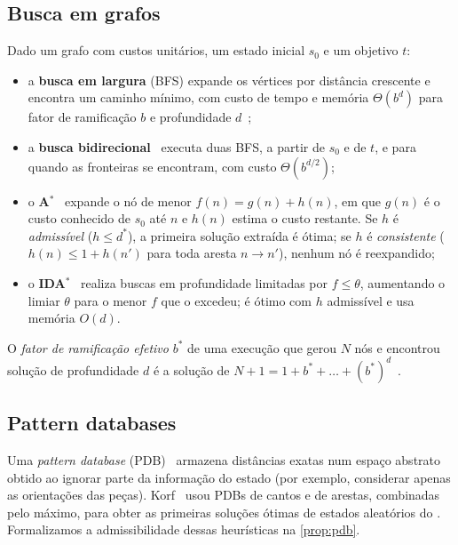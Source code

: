 \subsection{Busca em grafos}
Dado um grafo com custos unitários, um estado inicial $s_0$ e um objetivo $t$:
\begin{itemize}[nosep]
\item a \textbf{busca em largura} (BFS) expande os vértices por distância crescente e encontra um caminho mínimo, com custo de tempo e memória $\Theta(b^d)$ para fator de ramificação $b$ e profundidade $d$~\cite{russell2021};
\item a \textbf{busca bidirecional}~\cite{pohl1971} executa duas BFS, a partir de $s_0$ e de $t$, e para quando as fronteiras se encontram, com custo $\Theta(b^{d/2})$;
\item o \textbf{A$^*$}~\cite{hart1968} expande o nó de menor $f(n)=g(n)+h(n)$, em que $g(n)$ é o custo conhecido de $s_0$ até $n$ e $h(n)$ estima o custo restante. Se $h$ é \emph{admissível} ($h\le d^*$), a primeira solução extraída é ótima; se $h$ é \emph{consistente} ($h(n)\le 1+h(n')$ para toda aresta $n\to n'$), nenhum nó é reexpandido;
\item o \textbf{IDA$^*$}~\cite{korf1985} realiza buscas em profundidade limitadas por $f\le\theta$, aumentando o limiar $\theta$ para o menor $f$ que o excedeu; é ótimo com $h$ admissível e usa memória $O(d)$.
\end{itemize}
O \emph{fator de ramificação efetivo} $b^*$ de uma execução que gerou $N$ nós e encontrou solução de profundidade $d$ é a solução de $N+1=1+b^*+\dots+(b^*)^d$~\cite{russell2021}.

\subsection{Pattern databases}
Uma \emph{pattern database} (PDB)~\cite{culberson1998} armazena distâncias exatas num espaço abstrato obtido ao ignorar parte da informação do estado (por exemplo, considerar apenas as orientações das peças). Korf~\cite{korf1997} usou PDBs de cantos e de arestas, combinadas pelo máximo, para obter as primeiras soluções ótimas de estados aleatórios do . Formalizamos a admissibilidade dessas heurísticas na \cref{prop:pdb}.
